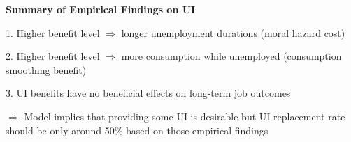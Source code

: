 \documentclass[landscape]{slides}
\begin{document}
\begin{slide}
\begin{center}
{\bf Summary of Empirical Findings on UI}
\end{center}

1. Higher benefit level $\Rightarrow$ longer unemployment durations (moral hazard cost)

2. Higher benefit level $\Rightarrow$ more consumption while unemployed (consumption smoothing benefit)

3. UI benefits have no beneficial effects on long-term job outcomes

$\Rightarrow$ Model implies that providing some UI is desirable but UI replacement rate should
be only around 50\% based on those empirical findings

\end{slide}

%
%
%
%
%
%
%
%
%
%
%
%
%
%
%
%
\end{document}
